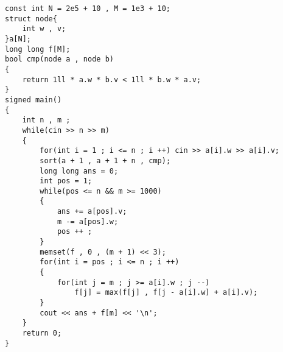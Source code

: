 \documentclass[E:/GsjzTle/main/main.tex]{subfiles}
\begin{document}
\begin{itemize}
\begin{lstlisting}
const int N = 2e5 + 10 , M = 1e3 + 10;
struct node{
	int w , v;
}a[N];
long long f[M];
bool cmp(node a , node b)
{
	return 1ll * a.w * b.v < 1ll * b.w * a.v;
}
signed main()
{
	int n , m ;
	while(cin >> n >> m)
	{
		for(int i = 1 ; i <= n ; i ++) cin >> a[i].w >> a[i].v; 
		sort(a + 1 , a + 1 + n , cmp);
		long long ans = 0;
		int pos = 1;
		while(pos <= n && m >= 1000)
		{
			ans += a[pos].v;
			m -= a[pos].w;
			pos ++ ;
		}
		memset(f , 0 , (m + 1) << 3);
		for(int i = pos ; i <= n ; i ++)
		{
			for(int j = m ; j >= a[i].w ; j --)
				f[j] = max(f[j] , f[j - a[i].w] + a[i].v);
		}
		cout << ans + f[m] << '\n';
	}
	return 0;
}
\end{lstlisting}
\end{itemize}
\end{document}
